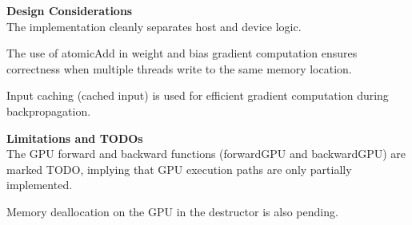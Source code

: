 \textbf{Design Considerations}\\
The implementation cleanly separates host and device logic.

The use of atomicAdd in weight and bias gradient computation ensures correctness when multiple threads write to the same memory location.

Input caching (cached input) is used for efficient gradient computation during backpropagation.

\textbf{Limitations and TODOs}\\
The GPU forward and backward functions (forwardGPU and backwardGPU) are marked TODO, implying that GPU execution paths are only partially implemented.

Memory deallocation on the GPU in the destructor is also pending.